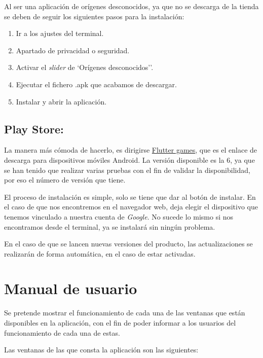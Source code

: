 Al ser una aplicación de orígenes desconocidos, ya que no se descarga de la tienda se deben de seguir los siguientes pasos para la instalación:
\begin{enumerate}
	\tightlist
	\item Ir a los ajustes del terminal.
	\item Apartado de privacidad o seguridad.
	\item Activar el \emph{slider} de `Orígenes desconocidos''.
	\item Ejecutar el fichero .apk que acabamos de descargar.
	\item Instalar y abrir la aplicación.
\end{enumerate}

\subsection{Play Store:}
La manera más cómoda de hacerlo, es dirigirse \href{https://play.google.com/store/apps/details?id=com.ubu.flutter_snake}{Flutter games}, que es el enlace de descarga para dispositivos móviles Android. La versión disponible es la 6, ya que se han tenido que realizar varias pruebas con el fin de validar la disponibilidad, por eso el número de versión que tiene.




El proceso de instalación es simple, solo se tiene que dar al botón de instalar. En el caso de que nos encontremos en el navegador web, deja elegir el dispositivo que tenemos vinculado a nuestra cuenta de \emph{Google}. No sucede lo mismo si nos encontramos desde el terminal, ya se instalará sin ningún problema.

En el caso de que se lancen nuevas versiones del producto, las actualizaciones se realizarán de forma automática, en el caso de estar activadas.

\section{Manual de usuario}
Se pretende mostrar el funcionamiento de cada una de las ventanas que están disponibles en la aplicación, con el fin de poder informar a los usuarios del funcionamiento de cada una de estas.

Las ventanas de las que consta la aplicación son las siguientes:

